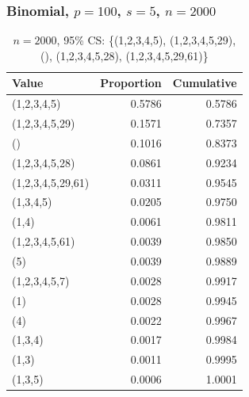 \documentclass{beamer}
\begin{document}
\begin{frame}
  \frametitle{Binomial, $p=100$, $s=5$, $n=2000$}
  \begin{table}[h]
    \footnotesize
    \centering
    \begin{tabular}{l|r|r}
      Value & Proportion & Cumulative \\
      \hline
      (1,2,3,4,5) & 0.5786 & 0.5786 \\
      (1,2,3,4,5,29) & 0.1571 & 0.7357 \\
      () & 0.1016 & 0.8373 \\
      (1,2,3,4,5,28) & 0.0861 & 0.9234 \\
      (1,2,3,4,5,29,61) & 0.0311 & 0.9545 \\
      (1,3,4,5) & 0.0205 & 0.9750 \\
      (1,4) & 0.0061 & 0.9811 \\
      (1,2,3,4,5,61) & 0.0039 & 0.9850 \\
      (5) & 0.0039 & 0.9889 \\
      (1,2,3,4,5,7) & 0.0028 & 0.9917 \\
      (1) & 0.0028 & 0.9945 \\
      (4) & 0.0022 & 0.9967 \\
      (1,3,4) & 0.0017 & 0.9984 \\
      (1,3) & 0.0011 & 0.9995 \\
      (1,3,5) & 0.0006 & 1.0001 \\
    \end{tabular}
    \caption{{\footnotesize $n=2000$, 95\% CS: \{(1,2,3,4,5), (1,2,3,4,5,29), (), (1,2,3,4,5,28), (1,2,3,4,5,29,61)\}}}
  \end{table}
\end{frame}
\end{document}
